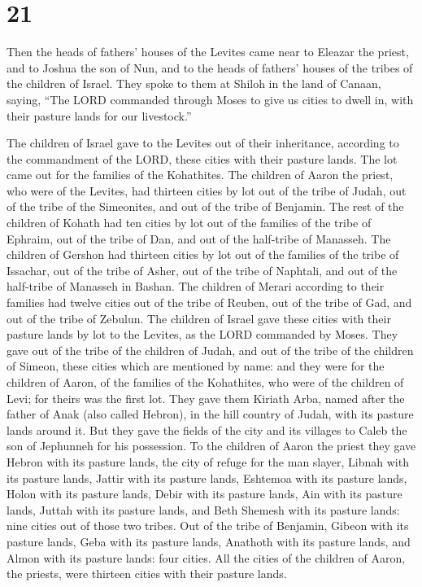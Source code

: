\hypertarget{section-20}{%
\section{21}\label{section-20}}

 Then the heads of fathers' houses of the Levites came
near to Eleazar the priest, and to Joshua the son of Nun, and to the
heads of fathers' houses of the tribes of the children of Israel.
 They spoke to them at Shiloh in the land of Canaan,
saying, ``The LORD commanded through Moses to give us cities to dwell
in, with their pasture lands for our livestock.''

 The children of Israel gave to the Levites out of their
inheritance, according to the commandment of the LORD, these cities with
their pasture lands.  The lot came out for the families of
the Kohathites. The children of Aaron the priest, who were of the
Levites, had thirteen cities by lot out of the tribe of Judah, out of
the tribe of the Simeonites, and out of the tribe of Benjamin.
 The rest of the children of Kohath had ten cities by lot
out of the families of the tribe of Ephraim, out of the tribe of Dan,
and out of the half-tribe of Manasseh.  The children of
Gershon had thirteen cities by lot out of the families of the tribe of
Issachar, out of the tribe of Asher, out of the tribe of Naphtali, and
out of the half-tribe of Manasseh in Bashan.  The children
of Merari according to their families had twelve cities out of the tribe
of Reuben, out of the tribe of Gad, and out of the tribe of Zebulun.
 The children of Israel gave these cities with their
pasture lands by lot to the Levites, as the LORD commanded by Moses.
 They gave out of the tribe of the children of Judah, and
out of the tribe of the children of Simeon, these cities which are
mentioned by name:  and they were for the children of
Aaron, of the families of the Kohathites, who were of the children of
Levi; for theirs was the first lot.  They gave them
Kiriath Arba, named after the father of Anak (also called Hebron), in
the hill country of Judah, with its pasture lands around it.
 But they gave the fields of the city and its villages to
Caleb the son of Jephunneh for his possession.  To the
children of Aaron the priest they gave Hebron with its pasture lands,
the city of refuge for the man slayer, Libnah with its pasture lands,
 Jattir with its pasture lands, Eshtemoa with its pasture
lands,  Holon with its pasture lands, Debir with its
pasture lands,  Ain with its pasture lands, Juttah with
its pasture lands, and Beth Shemesh with its pasture lands: nine cities
out of those two tribes.  Out of the tribe of Benjamin,
Gibeon with its pasture lands, Geba with its pasture lands,
 Anathoth with its pasture lands, and Almon with its
pasture lands: four cities.  All the cities of the
children of Aaron, the priests, were thirteen cities with their pasture
lands.

